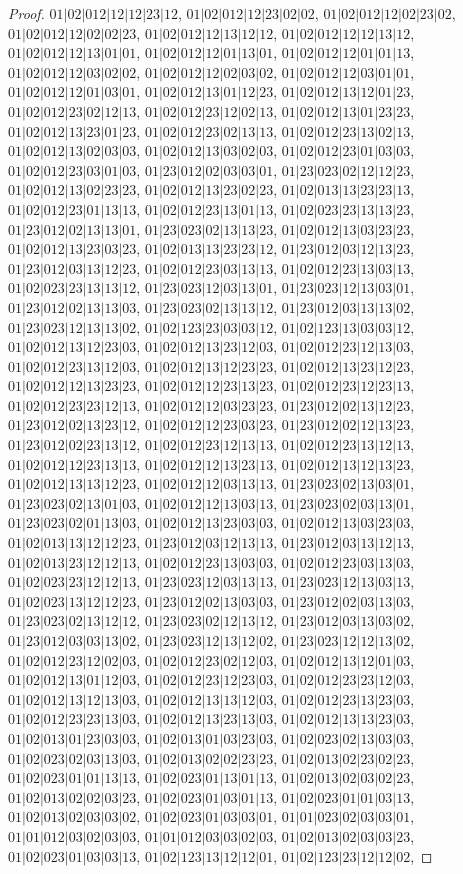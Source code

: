 \documentclass[12pt]{article}
\theoremstyle{plain}
\theoremstyle{definition}
\theoremstyle{remark}
\begin{document}
\begin{proof}
$01|02|012|12|12|23|12$, $01|02|012|12|23|02|02$, $01|02|012|12|02|23|02$, $01|02|012|12|02|02|23$, $01|02|012|12|13|12|12$, $01|02|012|12|12|13|12$, $01|02|012|12|13|01|01$, $01|02|012|12|01|13|01$, $01|02|012|12|01|01|13$, $01|02|012|12|03|02|02$, $01|02|012|12|02|03|02$, $01|02|012|12|03|01|01$, $01|02|012|12|01|03|01$, $01|02|012|13|01|12|23$, $01|02|012|13|12|01|23$, $01|02|012|23|02|12|13$, $01|02|012|23|12|02|13$, $01|02|012|13|01|23|23$, $01|02|012|13|23|01|23$, $01|02|012|23|02|13|13$, $01|02|012|23|13|02|13$, $01|02|012|13|02|03|03$, $01|02|012|13|03|02|03$, $01|02|012|23|01|03|03$, $01|02|012|23|03|01|03$, $01|23|012|02|03|03|01$, $01|23|023|02|12|12|23$, $01|02|012|13|02|23|23$, $01|02|012|13|23|02|23$, $01|02|013|13|23|23|13$, $01|02|012|23|01|13|13$, $01|02|012|23|13|01|13$, $01|02|023|23|13|13|23$, $01|23|012|02|13|13|01$, $01|23|023|02|13|13|23$, $01|02|012|13|03|23|23$, $01|02|012|13|23|03|23$, $01|02|013|13|23|23|12$, $01|23|012|03|12|13|23$, $01|23|012|03|13|12|23$, $01|02|012|23|03|13|13$, $01|02|012|23|13|03|13$, $01|02|023|23|13|13|12$, $01|23|023|12|03|13|01$, $01|23|023|12|13|03|01$, $01|23|012|02|13|13|03$, $01|23|023|02|13|13|12$, $01|23|012|03|13|13|02$, $01|23|023|12|13|13|02$, $01|02|123|23|03|03|12$, $01|02|123|13|03|03|12$, $01|02|012|13|12|23|03$, $01|02|012|13|23|12|03$, $01|02|012|23|12|13|03$, $01|02|012|23|13|12|03$, $01|02|012|13|12|23|23$, $01|02|012|13|23|12|23$, $01|02|012|12|13|23|23$, $01|02|012|12|23|13|23$, $01|02|012|23|12|23|13$, $01|02|012|23|23|12|13$, $01|02|012|12|03|23|23$, $01|23|012|02|13|12|23$, $01|23|012|02|13|23|12$, $01|02|012|12|23|03|23$, $01|23|012|02|12|13|23$, $01|23|012|02|23|13|12$, $01|02|012|23|12|13|13$, $01|02|012|23|13|12|13$, $01|02|012|12|23|13|13$, $01|02|012|12|13|23|13$, $01|02|012|13|12|13|23$, $01|02|012|13|13|12|23$, $01|02|012|12|03|13|13$, $01|23|023|02|13|03|01$, $01|23|023|02|13|01|03$, $01|02|012|12|13|03|13$, $01|23|023|02|03|13|01$, $01|23|023|02|01|13|03$, $01|02|012|13|23|03|03$, $01|02|012|13|03|23|03$, $01|02|013|13|12|12|23$, $01|23|012|03|12|13|13$, $01|23|012|03|13|12|13$, $01|02|013|23|12|12|13$, $01|02|012|23|13|03|03$, $01|02|012|23|03|13|03$, $01|02|023|23|12|12|13$, $01|23|023|12|03|13|13$, $01|23|023|12|13|03|13$, $01|02|023|13|12|12|23$, $01|23|012|02|13|03|03$, $01|23|012|02|03|13|03$, $01|23|023|02|13|12|12$, $01|23|023|02|12|13|12$, $01|23|012|03|13|03|02$, $01|23|012|03|03|13|02$, $01|23|023|12|13|12|02$, $01|23|023|12|12|13|02$, $01|02|012|23|12|02|03$, $01|02|012|23|02|12|03$, $01|02|012|13|12|01|03$, $01|02|012|13|01|12|03$, $01|02|012|23|12|23|03$, $01|02|012|23|23|12|03$, $01|02|012|13|12|13|03$, $01|02|012|13|13|12|03$, $01|02|012|23|13|23|03$, $01|02|012|23|23|13|03$, $01|02|012|13|23|13|03$, $01|02|012|13|13|23|03$, $01|02|013|01|23|03|03$, $01|02|013|01|03|23|03$, $01|02|023|02|13|03|03$, $01|02|023|02|03|13|03$, $01|02|013|02|02|23|23$, $01|02|013|02|23|02|23$, $01|02|023|01|01|13|13$, $01|02|023|01|13|01|13$, $01|02|013|02|03|02|23$, $01|02|013|02|02|03|23$, $01|02|023|01|03|01|13$, $01|02|023|01|01|03|13$, $01|02|013|02|03|03|02$, $01|02|023|01|03|03|01$, $01|01|023|02|03|03|01$, $01|01|012|03|02|03|03$, $01|01|012|03|03|02|03$, $01|02|013|02|03|03|23$, $01|02|023|01|03|03|13$, $01|02|123|13|12|12|01$, $01|02|123|23|12|12|02$, 
\end{proof}
\end{document}

